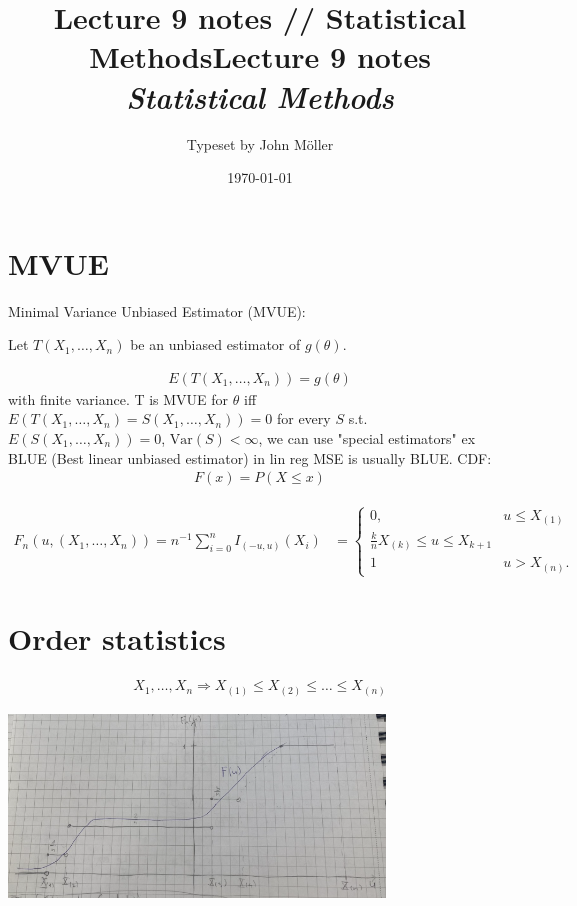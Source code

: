 \documentclass[10pt]{article}
\author{Typeset by John Möller}
\date{\today}
\title{Lecture 9 notes // Statistical Methods}
\begin{document}
\title{{Lecture 9 notes}\\{\normalsize{\itshape Statistical Methods}}}
\pagestyle{fancynotes}
\maketitle
\section{MVUE}
\label{sec:orgb0d0440}
Minimal Variance Unbiased Estimator (MVUE):

\begin{theorem} \label{thm:Lehman-Schally}
Let \(T(X_1, \dots , X_n)\) be an unbiased estimator of \(g(\theta )\).

\begin{align*}
E(T(X_1 , \dots , X_n)) =  g(\theta )
\end{align*}
with finite variance.
T is MVUE for \(\theta\) iff \(E(T(X_1, \dots , X_n) = S(X_1 , \dots , X_n)) =  0\) for every \(S\) s.t. \(E(S(X_1 , \dots , X_n )) =  0\),
\(\text{Var}(S) < \infty\),
we can use "special estimators" ex BLUE (Best linear unbiased estimator) in lin reg MSE is usually BLUE.
CDF:
\begin{align*}
F(x) =  P( X \leq x)
\end{align*}
\end{theorem}

\begin{definition}  \label{def:Empirical_cumulative_distribution_function}
\begin{align*}
F_n (u, (X_1, \dots , X_n)) =  n  ^{ - 1} \sum_{ i = 0 }^{ n } I  _{( - u, u)} (X_i)  &  =
\begin{cases}
0,  &  u \leq X _{(1)} \\
\frac{k}{n} X  _{(k)}  \leq u \leq  X  _{k + 1} \\
1  &  u > X  _{(n)} .
\end{cases}
\end{align*}
\end{definition}

\section{Order statistics}
\label{sec:orgaf8312e}
\begin{align*}
X_1 , \dots , X_n  \Rightarrow X  _{(1)} \leq X _{(2)} \leq \dots \leq X  _{(n)} 
\end{align*}
\begin{center}
\includegraphics[angle=0,width=10cm]{./img/order.png}
\end{center}
\end{document}
